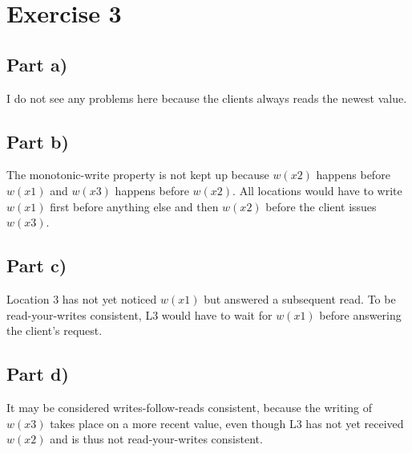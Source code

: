 \documentclass[10pt,a4paper]{article}
\begin{document}
\section*{Exercise 3}

\subsection*{Part a)}

I do not see any problems here because the clients always reads the newest value.

\subsection*{Part b)}

The monotonic-write property is not kept up because $w(x2)$ happens before $w(x1)$ and $w(x3)$ happens before $w(x2)$.
All locations would have to write $w(x1)$ first before anything else and then $w(x2)$ before the client issues $w(x3)$.

\subsection*{Part c)}

Location 3 has not yet noticed $w(x1)$ but answered a subsequent read.
To be read-your-writes consistent, L3 would have to wait for $w(x1)$ before answering the client's request.

\subsection*{Part d)}

It may be considered writes-follow-reads consistent, because the writing of $w(x3)$ takes place on a more recent value, even though L3 has not yet received $w(x2)$ and is thus not read-your-writes consistent.
\end{document}
